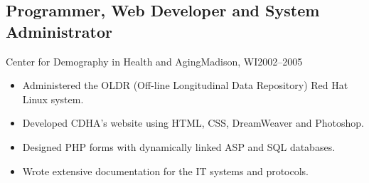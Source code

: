 \documentclass[../main.tex]{subfiles}
\begin{document}
	\subsection{Programmer, Web Developer and System Administrator}{Center for Demography in Health and Aging}{Madison, WI}{2002--2005}
	\begin{itemize}
		\item{Administered the OLDR (Off-line Longitudinal Data Repository) Red Hat Linux system.}
		\item{Developed CDHA's website using HTML, CSS, DreamWeaver and Photoshop.}
		\item{Designed PHP forms with dynamically linked ASP and SQL databases. }
		\item{Wrote extensive documentation for the IT systems and protocols.}

	\end{itemize}
\end{document}

